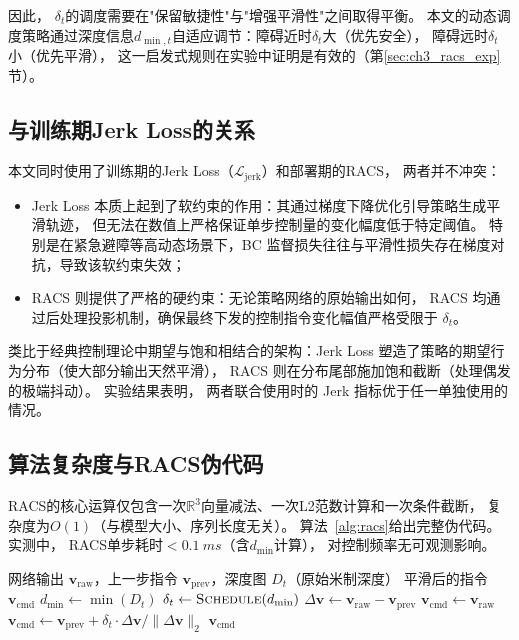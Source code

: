 因此，
$\delta_t$的调度需要在"保留敏捷性"与"增强平滑性"之间取得平衡。
本文的动态调度策略通过深度信息$d_{\min,t}$自适应调节：障碍近时$\delta_t$大（优先安全），
障碍远时$\delta_t$小（优先平滑），
这一启发式规则在实验中证明是有效的（第\ref{sec:ch3_racs_exp}节）。

\subsection{与训练期Jerk Loss的关系}

本文同时使用了训练期的Jerk Loss（$\mathcal{L}_{\text{jerk}}$）和部署期的RACS，
两者并不冲突：

\begin{itemize}
  \item Jerk Loss 本质上起到了软约束的作用：其通过梯度下降优化引导策略生成平滑轨迹，
    但无法在数值上严格保证单步控制量的变化幅度低于特定阈值。
    特别是在紧急避障等高动态场景下，BC 监督损失往往与平滑性损失存在梯度对抗，导致该软约束失效；
  \item RACS 则提供了严格的硬约束：无论策略网络的原始输出如何，
    RACS 均通过后处理投影机制，确保最终下发的控制指令变化幅值严格受限于 $\delta_t$。
\end{itemize}

类比于经典控制理论中期望与饱和相结合的架构：Jerk Loss 塑造了策略的期望行为分布（使大部分输出天然平滑），
RACS 则在分布尾部施加饱和截断（处理偶发的极端抖动）。
实验结果表明，
两者联合使用时的 Jerk 指标优于任一单独使用的情况。

\subsection{算法复杂度与RACS伪代码}

RACS的核心运算仅包含一次$\mathbb{R}^3$向量减法、一次L2范数计算和一次条件截断，
复杂度为$O(1)$（与模型大小、序列长度无关）。
算法~\ref{alg:racs}给出完整伪代码。
实测中，
RACS单步耗时$<\SI{0.1}{ms}$（含$d_{\min}$计算），
对控制频率无可观测影响。

\begin{algorithm}[H]
\caption{RACS动态速率限制控制平滑器}
\label{alg:racs}
\begin{algorithmic}[1]
\Require 网络输出 $\mathbf{v}_{\text{raw}}$，上一步指令 $\mathbf{v}_{\text{prev}}$，深度图 $D_t$（原始米制深度）
\Ensure 平滑后的指令 $\mathbf{v}_{\text{cmd}}$
\State $d_{\min} \leftarrow \min(D_t)$ 
\State $\delta_t \leftarrow \textsc{Schedule}(d_{\min})$ 
\State $\Delta \mathbf{v} \leftarrow \mathbf{v}_{\text{raw}} - \mathbf{v}_{\text{prev}}$
  \State $\mathbf{v}_{\text{cmd}} \leftarrow \mathbf{v}_{\text{raw}}$ 
\Else
  \State $\mathbf{v}_{\text{cmd}} \leftarrow \mathbf{v}_{\text{prev}} + \delta_t \cdot \Delta \mathbf{v} / \|\Delta \mathbf{v}\|_2$ 
\EndIf
\State \Return $\mathbf{v}_{\text{cmd}}$
\end{algorithmic}
\end{algorithm}


